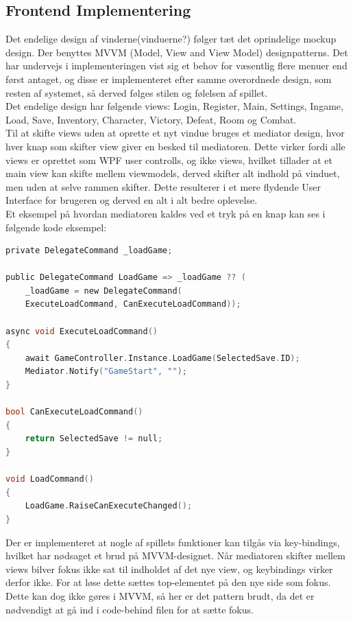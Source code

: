 \subsection{Frontend Implementering}
\label{sec:Frontend Implementering}
Det endelige design af vinderne(vinduerne?) følger tæt det oprindelige mockup design. Der benyttes MVVM (Model, View and View Model) designpatterns.  Det har undervejs i implementeringen vist sig et behov for væsentlig flere menuer end først antaget, og disse er implementeret efter samme overordnede design, som resten af systemet, så derved følges stilen og følelsen af spillet.\\
Det endelige design har følgende views:
Login, Register, Main, Settings, Ingame, Load, Save, Inventory, Character, Victory, Defeat, Room og Combat.\\
Til at skifte views uden at oprette et nyt vindue bruges et mediator design, hvor hver knap som skifter view giver en besked til mediatoren. Dette virker fordi alle views er oprettet som WPF user controlls, og ikke views, hvilket tillader at et main view kan skifte mellem viewmodels, derved skifter alt indhold på vinduet, men uden at selve rammen skifter. Dette resulterer i et mere flydende User Interface for brugeren og derved en alt i alt bedre oplevelse. \cite{Mediator}\\
Et eksempel på hvordan mediatoren kaldes ved et tryk på en knap kan ses i følgende kode eksempel:

\begin{lstlisting}[language=c]
private DelegateCommand _loadGame;
    
public DelegateCommand LoadGame => _loadGame ?? (
	_loadGame = new DelegateCommand(
	ExecuteLoadCommand, CanExecuteLoadCommand));

async void ExecuteLoadCommand()
{
    await GameController.Instance.LoadGame(SelectedSave.ID);
    Mediator.Notify("GameStart", "");
}

bool CanExecuteLoadCommand()
{
    return SelectedSave != null;
}

void LoadCommand()
{
    LoadGame.RaiseCanExecuteChanged();
}
\end{lstlisting}

\noindent Der er implementeret at nogle af spillets funktioner kan tilgås via key-bindings, hvilket har nødsaget et brud på MVVM-designet. Når mediatoren skifter mellem views bilver fokus ikke sat til indholdet af det nye view, og keybindings virker derfor ikke. For at løse dette sættes top-elementet på den nye side som fokus. Dette kan dog ikke gøres i MVVM, så her er det pattern brudt, da det er nødvendigt at gå ind i code-behind filen for at sætte fokus.

